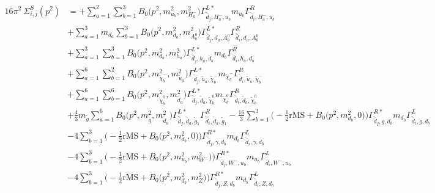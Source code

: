 \begin{itemize}
\begin{align} 
16\pi^2 \ \Sigma^S_{i,j}(p^2) &= +\sum_{a=1}^{2}\sum_{b=1}^{3}{B_0\Big(p^{2},m^2_{u_{{b}}},m^2_{H^-_{{a}}}\Big)} {\Gamma^{L*}_{\check{\bar{d}}_{{j}},H^-_{{a}},u_{{b}}}} m_{u_{{b}}} {\Gamma^R_{\check{\bar{d}}_{{i}},H^-_{{a}},u_{{b}}}} \nonumber \\ 
 &+\sum_{a=1}^{3}m_{d_{{a}}} \sum_{b=1}^{3}{B_0\Big(p^{2},m^2_{d_{{a}}},m^2_{A^0_{{b}}}\Big)} {\Gamma^{L*}_{\check{\bar{d}}_{{j}},d_{{a}},A^0_{{b}}}} {\Gamma^R_{\check{\bar{d}}_{{i}},d_{{a}},A^0_{{b}}}}  \nonumber \\ 
 &+\sum_{a=1}^{3}\sum_{b=1}^{3}{B_0\Big(p^{2},m^2_{d_{{b}}},m^2_{h_{{a}}}\Big)} {\Gamma^{L*}_{\check{\bar{d}}_{{j}},h_{{a}},d_{{b}}}} m_{d_{{b}}} {\Gamma^R_{\check{\bar{d}}_{{i}},h_{{a}},d_{{b}}}} \nonumber \\ 
 &+\sum_{a=1}^{6}\sum_{b=1}^{2}{B_0\Big(p^{2},m^2_{\tilde{\chi}^-_{{b}}},m^2_{\tilde{u}_{{a}}}\Big)} {\Gamma^{L*}_{\check{\bar{d}}_{{j}},\tilde{u}_{{a}},\tilde{\chi}^-_{{b}}}} m_{\tilde{\chi}^-_{{b}}} {\Gamma^R_{\check{\bar{d}}_{{i}},\tilde{u}_{{a}},\tilde{\chi}^-_{{b}}}} \nonumber \\ 
 &+\sum_{a=1}^{6}\sum_{b=1}^{6}{B_0\Big(p^{2},m^2_{\tilde{\chi}^0_{{b}}},m^2_{\tilde{d}_{{a}}}\Big)} {\Gamma^{L*}_{\check{\bar{d}}_{{j}},\tilde{d}_{{a}},\tilde{\chi}^0_{{b}}}} m_{\tilde{\chi}^0_{{b}}} {\Gamma^R_{\check{\bar{d}}_{{i}},\tilde{d}_{{a}},\tilde{\chi}^0_{{b}}}} \nonumber \\ 
 &+\frac{4}{3} m_{\tilde{g}} \sum_{a=1}^{6}{B_0\Big(p^{2},m^2_{\tilde{g}},m^2_{\tilde{d}_{{a}}}\Big)} {\Gamma^{L*}_{\check{\bar{d}}_{{j}},\tilde{d}_{{a}},\tilde{g}_{{1}}}} {\Gamma^R_{\check{\bar{d}}_{{i}},\tilde{d}_{{a}},\tilde{g}_{{1}}}}  -\frac{16}{3} \sum_{b=1}^{3}\Big(-\frac{1}{2} \text{rMS}  + {B_0\Big(p^{2},m^2_{d_{{b}}},0\Big)}\Big){\Gamma^{R*}_{\check{\bar{d}}_{{j}},g,d_{{b}}}} m_{d_{{b}}} {\Gamma^L_{\check{\bar{d}}_{{i}},g,d_{{b}}}}  \nonumber \\ 
 &-4 \sum_{b=1}^{3}\Big(-\frac{1}{2} \text{rMS}  + {B_0\Big(p^{2},m^2_{d_{{b}}},0\Big)}\Big){\Gamma^{R*}_{\check{\bar{d}}_{{j}},\gamma,d_{{b}}}} m_{d_{{b}}} {\Gamma^L_{\check{\bar{d}}_{{i}},\gamma,d_{{b}}}}  \nonumber \\ 
 &-4 \sum_{b=1}^{3}\Big(-\frac{1}{2} \text{rMS}  + {B_0\Big(p^{2},m^2_{u_{{b}}},m^2_{W^-}\Big)}\Big){\Gamma^{R*}_{\check{\bar{d}}_{{j}},W^-,u_{{b}}}} m_{u_{{b}}} {\Gamma^L_{\check{\bar{d}}_{{i}},W^-,u_{{b}}}}  \nonumber \\ 
 &-4 \sum_{b=1}^{3}\Big(-\frac{1}{2} \text{rMS}  + {B_0\Big(p^{2},m^2_{d_{{b}}},m^2_{Z}\Big)}\Big){\Gamma^{R*}_{\check{\bar{d}}_{{j}},Z,d_{{b}}}} m_{d_{{b}}} {\Gamma^L_{\check{\bar{d}}_{{i}},Z,d_{{b}}}}  \nonumber \\ 

\end{align}
\end{itemize}
